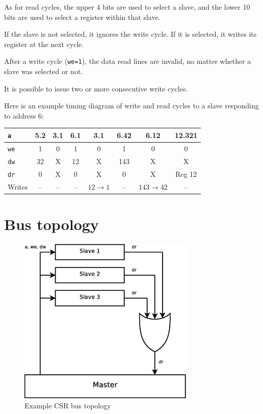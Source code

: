\documentclass[a4paper,11pt]{article}
\begin{document}
As for read cycles, the upper 4 bits are used to select a slave, and the lower 10 bits are used to select a register within that slave.

If the slave is not selected, it ignores the write cycle. If it is selected, it writes its register at the next cycle.

After a write cycle (\verb!we=1!), the data read lines are invalid, no matter whether a slave was selected or not.

It is possible to issue two or more consecutive write cycles.

Here is an example timing diagram of write and read cycles to a slave responding to address 6:

\begin{tabular}{|l|c|c|c|c|c|c|c|}
\hline
\verb!a! & 5.2 & 3.1 & 6.1 & 3.1 & 6.42 & 6.12 & 12.321 \\
\hline
\verb!we! & 1 & 0 & 1 & 0 & 1 & 0 & 0 \\
\hline
\verb!dw! & 32 & X & 12 & X & 143 & X & X \\
\hline
\verb!dr! & 0 & X & 0 & X & 0 & X & Reg 12 \\
\hline
Writes & -- & -- & -- & $12\to1$ & -- & $143\to42$ & -- \\
\hline
\end{tabular}

\section{Bus topology}

\begin{figure}[H]
\centering
\includegraphics[height=80mm]{csr_topology.eps}
\caption{Example CSR bus topology}
\end{figure}
\end{document}
